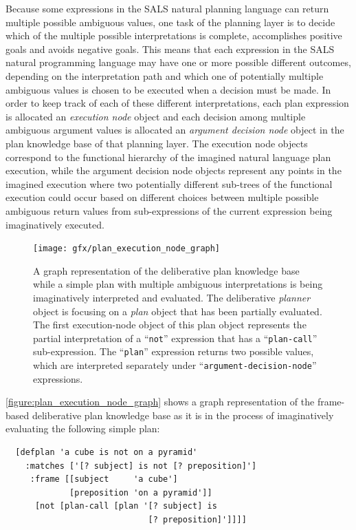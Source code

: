 Because some expressions in the SALS natural planning language can
return multiple possible ambiguous values, one task of the planning
layer is to decide which of the multiple possible interpretations is
complete, accomplishes positive goals and avoids negative goals.  This
means that each expression in the SALS natural programming language
may have one or more possible different outcomes, depending on the
interpretation path and which one of potentially multiple ambiguous
values is chosen to be executed when a decision must be made.  In
order to keep track of each of these different interpretations, each
plan expression is allocated an {\emph{execution node}} object and
each decision among multiple ambiguous argument values is allocated an
{\emph{argument decision node}} object in the plan knowledge base of
that planning layer.  The execution node objects correspond to the
functional hierarchy of the imagined natural language plan execution,
while the argument decision node objects represent any points in the
imagined execution where two potentially different sub-trees of the
functional execution could occur based on different choices between
multiple possible ambiguous return values from sub-expressions of the
current expression being imaginatively executed.
\begin{figure}
\hspace*{-1cm}\texttt{[image: gfx/plan\_execution\_node\_graph]}
\caption[A graph representation of the deliberative plan knowledge
  base while a simple plan with multiple ambiguous interpretations is
  being imaginatively interpreted and evaluated.]{A graph
  representation of the deliberative plan knowledge base while a
  simple plan with multiple ambiguous interpretations is being
  imaginatively interpreted and evaluated.  The deliberative
  {\emph{planner}} object is focusing on a {\emph{plan}} object that
  has been partially evaluated.  The first execution-node object of
  this plan object represents the partial interpretation of a
  ``{\tt{not}}'' expression that has a ``{\tt{plan-call}}''
  sub-expression.  The ``{\tt{plan}}'' expression returns two possible
  values, which are interpreted separately under
  ``{\tt{argument-decision-node}}'' expressions.}
\label{figure:plan_execution_node_graph}
\end{figure}
{\mbox{\autoref{figure:plan_execution_node_graph}}} shows a graph
representation of the frame-based deliberative plan knowledge base as
it is in the process of imaginatively evaluating the following simple
plan:
\begin{samepage}
\begin{Verbatim}
  [defplan 'a cube is not on a pyramid'
    :matches ['[? subject] is not [? preposition]']
     :frame [[subject     'a cube']
             [preposition 'on a pyramid']]
      [not [plan-call [plan '[? subject] is
                             [? preposition]']]]]
\end{Verbatim}
\end{samepage}
